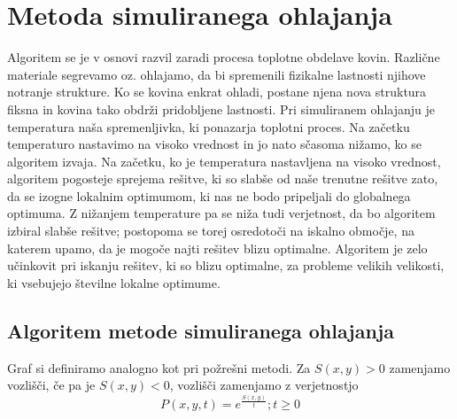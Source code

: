 \documentclass[12pt,a4paper]{amsart}
\theoremstyle{definition} %
\theoremstyle{plain} %
\begin{document}
\section{Metoda simuliranega ohlajanja}
Algoritem se je v osnovi razvil zaradi procesa toplotne obdelave kovin. Različne materiale segrevamo oz. ohlajamo, da bi spremenili fizikalne lastnosti njihove notranje strukture. Ko se kovina enkrat ohladi, postane njena nova struktura fiksna in kovina tako obdrži pridobljene lastnosti. Pri simuliranem ohlajanju je temperatura naša spremenljivka, ki ponazarja toplotni proces. Na začetku temperaturo nastavimo na visoko vrednost in jo nato sčasoma nižamo, ko se algoritem izvaja. Na začetku, ko je temperatura nastavljena na visoko vrednost, algoritem pogosteje sprejema rešitve, ki so slabše od naše trenutne rešitve zato, da se izogne lokalnim optimumom, ki nas ne bodo pripeljali do globalnega optimuma. Z nižanjem temperature pa se niža tudi verjetnost, da bo algoritem izbiral slabše rešitve; postopoma se torej osredotoči na iskalno območje, na katerem upamo, da je mogoče najti rešitev blizu optimalne. Algoritem je zelo učinkovit pri iskanju rešitev, ki so blizu optimalne, za probleme velikih velikosti, ki vsebujejo številne lokalne optimume.

\subsection{Algoritem metode simuliranega ohlajanja}
Graf si definiramo analogno kot pri požrešni metodi. Za $S(x,y)>0$ zamenjamo vozlišči, če pa je $S(x,y)<0$, vozlišči zamenjamo z verjetnostjo $$P(x,y,t) = e^{\frac{S(x,y)}{t}}; t\ge 0$$
\end{document}
